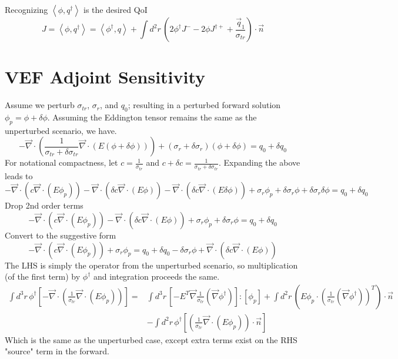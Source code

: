 \documentclass{article}
\newcommand{\bra}{\left\langle}
\newcommand{\ket}{\right\rangle}
\newcommand{\vdiv}{\vec{\nabla} \cdot}
\newcommand{\vgrad}{\vec{\nabla}}
\begin{document}
Recognizing $\bra \phi, q^\dag \ket $ is the desired QoI
\[
J = \bra \phi, q^\dag \ket = \bra \phi^\dag , q \ket + \int d^2 r \, \left( 2\phi^\dag J^- - 2\phi J^{ \dag + }   +  \frac{\vec{q}_1}{\sigma_{tr}} \right) \cdot \vec{n}
\]
\section{VEF Adjoint Sensitivity}
Assume we perturb $\sigma_{tr}$, $\sigma_r$, and $q_0$; resulting in a perturbed forward solution $\phi_p = \phi + \delta \phi$. Assuming the Eddington tensor remains the same as the unperturbed scenario, we have.
\[
-\vdiv \left( \frac{1}{\sigma_{tr}+\delta \sigma_{tr}} \vdiv \left( E \left( \phi + \delta \phi \right) \right) \right)
+ \left( \sigma_r + \delta \sigma_r \right) \left( \phi + \delta \phi \right)
= q_0 + \delta q_0
\]
For notational compactness, let $c=\frac{1}{\sigma_{tr}}$ and $c + \delta c = \frac{1}{\sigma_{tr}+\delta \sigma_{tr}}$. Expanding the above leads to 
\[ 
-\vdiv \left( c \vdiv \left( E \phi_p \right) \right) 
- \vdiv \left( \delta c \vdiv \left( E \phi \right) \right) 
- \vdiv \left( \delta c \vdiv \left( E \delta \phi \right) \right) 
+ \sigma_r \phi_p
+ \delta \sigma_r \phi
+ \delta \sigma_r \delta \phi
= q_0 + \delta q_0 
\]
Drop 2nd order terms
\[ 
-\vdiv \left( c \vdiv \left( E \phi_p \right) \right) 
- \vdiv \left( \delta c \vdiv \left( E \phi \right) \right) 
+ \sigma_r \phi_p
+ \delta \sigma_r \phi
= q_0 + \delta q_0 
\]
Convert to the suggestive form
\[ 
-\vdiv \left( c \vdiv \left( E \phi_p \right) \right) + \sigma_r \phi_p
= q_0 + \delta q_0 - \delta \sigma_r \phi + \vdiv \left( \delta c \vdiv \left( E \phi \right) \right) 
\]
The LHS is simply the operator from the unperturbed scenario, so multiplication (of the first term) by $\phi^\dag$ and integration proceeds the same.
\begin{align*}
\int d^3r \, \phi^\dag \left[  -\vdiv \left( \frac{1}{\sigma_{tr}} \vdiv \left( E \phi_p \right) \right) \right] 
=& \int d^3r \, \left[- E^T \vgrad \frac{1}{ \sigma_{tr}} \left(  \vgrad \phi^\dag \right) \right] : \left[ \phi_p \right] 
+ \int d^2 r \, \left( E \phi_p \cdot \left( \frac{1}{ \sigma_{tr}} \left(  \vgrad \phi^\dag \right) \right)^T \right) \cdot \vec{n} \\
&- \int d^2 r \, \phi^\dag \left[ \left( \frac{1}{\sigma_{tr}} \vdiv \left( E \phi_p \right) \right) \cdot \vec{n} \right]
\end{align*}
Which is the same as the unperturbed case, except extra terms exist on the RHS "source" term in the forward.
\end{document}

